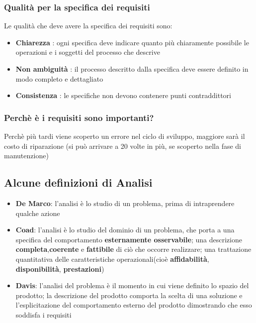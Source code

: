 \documentclass{report}
\begin{document}
                \subsubsection{Qualità per la specifica dei requisiti}
                    Le qualità che deve avere la specifica dei requisiti sono:
                    \begin{itemize}
                        \item \textbf{Chiarezza} : ogni specifica deve indicare quanto più chiaramente possibile le operazioni e i soggetti del processo che descrive
                        \item \textbf{Non ambiguità} : il processo descritto dalla specifica deve essere definito in modo completo e dettagliato 
                        \item \textbf{Consistenza} : le specifiche non devono contenere punti contraddittori 
                    \end{itemize}
                \subsubsection{Perchè è i requisiti sono importanti?}
                    Perchè più tardi viene scoperto un errore nel ciclo di sviluppo, maggiore sarà il costo di riparazione (si può arrivare a 20 volte in più, se scoperto nella fase di manutenzione)
            \subsection{Alcune definizioni di Analisi}
                \begin{itemize}
                    \item \textbf{De Marco}: l'analisi è lo studio di un problema, prima di intraprendere qualche azione 
                    \item \textbf{Coad}: l'analisi è lo studio del dominio di un problema, che porta a una specifica del comportamento \textbf{esternamente osservabile}; una descrizione \textbf{completa},\textbf{coerente} e \textbf{fattibile} di ciò che occorre realizzare; una trattazione quantitativa delle caratteristiche operazionali(cioè \textbf{affidabilità}, \textbf{disponibilità}, \textbf{prestazioni})
                    \item \textbf{Davis}: l'analisi del problema è il momento in cui viene definito lo spazio del prodotto; la descrizione del prodotto comporta la scelta di una soluzione e l'esplicitazione del comportamento esterno del prodotto dimostrando che esso soddisfa i requisiti
                \end{itemize}
\end{document}
